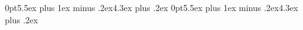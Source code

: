 \usepackage{geometry}
\geometry{a4paper, margin=1in}

\usepackage{charter}
\usepackage{inconsolata}

\usepackage[document]{ragged2e}
\usepackage[none]{hyphenat}
\usepackage[utf8]{inputenc}
\usepackage[english]{babel}

\usepackage{titling}
\setlength{\droptitle}{-40pt}

\usepackage{titlesec}
\titlespacing*{\section}
{0pt}{5.5ex plus 1ex minus .2ex}{4.3ex plus .2ex}
\titlespacing*{\subsection}
{0pt}{5.5ex plus 1ex minus .2ex}{4.3ex plus .2ex}

\usepackage{hyperref}

\newenvironment{myitemize}
{ \begin{itemize}
    \setlength{\itemsep}{2pt}
    \setlength{\parskip}{0pt}
    \setlength{\parsep}{0pt}     }
{ \end{itemize}                  }